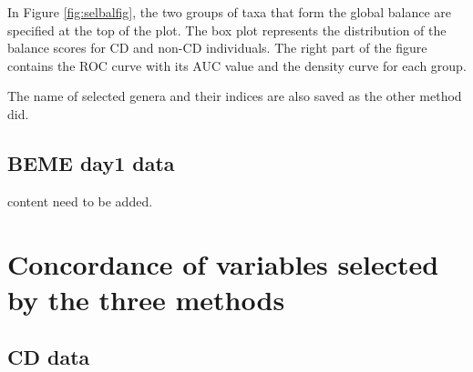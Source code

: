 \documentclass[]{book}
\newenvironment{Shaded}{\begin{snugshade}}{\end{snugshade}}
\newcommand{\KeywordTok}[1]{\textcolor[rgb]{0.13,0.29,0.53}{\textbf{#1}}}
\newcommand{\DecValTok}[1]{\textcolor[rgb]{0.00,0.00,0.81}{#1}}
\newcommand{\StringTok}[1]{\textcolor[rgb]{0.31,0.60,0.02}{#1}}
\newcommand{\OperatorTok}[1]{\textcolor[rgb]{0.81,0.36,0.00}{\textbf{#1}}}
\newcommand{\NormalTok}[1]{#1}
\begin{document}
In Figure \ref{fig:selbalfig}, the two groups of taxa that form the
global balance are specified at the top of the plot. The box plot
represents the distribution of the balance scores for CD and non-CD
individuals. The right part of the figure contains the ROC curve with
its AUC value and the density curve for each group.

\begin{Shaded}
\end{Shaded}

The name of selected genera and their indices are also saved as the
other method did.

\section{BEME day1 data}\label{beme-day1-data-3}

content need to be added.

\chapter{Concordance of variables selected by the three
methods}\label{comparison}

\section{CD data}\label{cd-data-3}
\end{document}
